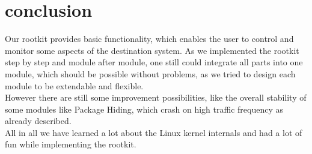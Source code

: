 \chapter{conclusion}
Our rootkit provides basic functionality, which enables the user to control and monitor some aspects of the destination system. As we implemented the rootkit step by step and module after module, one still could integrate all parts into one module, which should be possible without problems, as we tried to design each module to be extendable and flexible.\\
However there are still some improvement possibilities, like the overall stability of some modules like Package Hiding, which crash on high traffic frequency as already described.\\
All in all we have learned a lot about the Linux kernel internals and had a lot of fun while implementing the rootkit.

